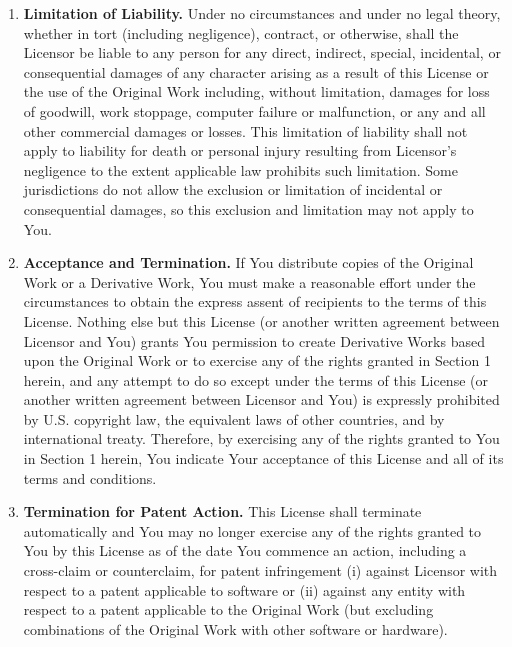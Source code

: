 \documentclass[letterpaper,10pt,titlepage]{custbook}
\begin{document}
\begin{it}
\begin{enumerate}
\item \textbf{Limitation of Liability.}  Under no circumstances and under no legal theory, whether in 
      tort (including negligence), contract, or otherwise, shall the Licensor be liable to any person for 
	  any direct, indirect, special, incidental, or consequential damages of any character arising 
	  as a result of this License or the use of the Original Work including, without limitation, 
	  damages for loss of goodwill, work stoppage, computer failure or malfunction, or any and all 
	  other commercial damages or losses. This limitation of liability shall not apply to liability 
	  for death or personal injury resulting from Licensor's negligence to the extent applicable law 
	  prohibits such limitation. Some jurisdictions do not allow the exclusion or limitation of 
	  incidental or consequential damages, so this exclusion and limitation may not apply to You. 

\item \textbf{Acceptance and Termination.}  If You distribute copies of the Original Work or a 
      Derivative Work, You must make a reasonable effort under the circumstances to 
      obtain the express assent of recipients to the terms of this License. Nothing 
      else but this License (or another written agreement between Licensor and You) 
      grants You permission to create Derivative Works based upon the Original Work 
      or to exercise any of the rights granted in Section 1 herein, and any attempt 
      to do so except under the terms of this License (or another written agreement 
      between Licensor and You) is expressly prohibited by U.S. copyright law, the 
      equivalent laws of other countries, and by international treaty. Therefore, 
      by exercising any of the rights granted to You in Section 1 herein, You indicate 
      Your acceptance of this License and all of its terms and conditions. 

\item \textbf{Termination for Patent Action.}  This License shall terminate automatically 
      and You may no longer exercise any of the rights granted to You by this License 
      as of the date You commence an action, including a cross-claim or counterclaim, 
      for patent infringement (i) against Licensor with respect to a patent applicable 
      to software or (ii) against any entity with respect to a patent applicable to 
      the Original Work (but excluding combinations of the Original Work with other 
      software or hardware). 


\end{enumerate}
\end{it}
\end{document}
